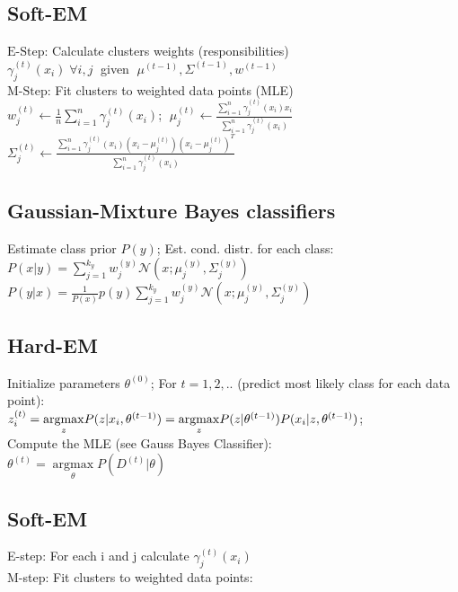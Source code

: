 \subsection*{Soft-EM}
$\text{E-Step}$: Calculate clusters weights (responsibilities)\\
$\gamma_j^{(t)}(x_i) \; \forall i,j \; $ given $ \; \mu^{(t-1)},\Sigma^{(t-1)}, w^{(t-1)}$ \\
$\text{M-Step}$: Fit clusters to weighted data points (MLE)\\
$w_j^{(t)} \leftarrow \frac{1}{n} \sum_{i=1}^n \gamma_j^{(t)} (x_i)$;  
$\; \mu_j^{(t)} \leftarrow \frac{\sum_{i=1}^n \gamma_j^{(t)} (x_i) x_i}{\sum_{i=1}^n \gamma_j^{(t)} (x_i)}$\\ 
$\Sigma_j^{(t)} \leftarrow \frac{\sum_{i=1}^n \gamma_j^{(t)}(x_i) (x_i - \mu_j^{(t)}) (x_i - \mu_j^{(t)})^T}{\sum_{i=1}^n \gamma_j^{(t)}(x_i)}$\\ 




\iffalse
\subsection*{Gaussian-Mixture Bayes classifiers}
Estimate class prior $P(y)$; Est. cond. distr. for each class:
$P(x|y) = \sum_{j=1}^{k_y} w_j^{(y)} \mathcal{N}(x; \mu_j^{(y)}, \Sigma_j^{(y)})$\\
$P(y|x) = \frac{1}{P(x)} p(y) \sum_{j=1}^{k_y} w_j^{(y)} \mathcal{N}(x; \mu_j^{(y)}, \Sigma_j^{(y)})$

\subsection*{Hard-EM}
Initialize parameters $\theta^{(0)}$; For $t=1,2,..$ (predict most likely class for each data point):\\
$z_i^{(t)} = \underset{z}{\operatorname{argmax}} P(z|x_i, \theta^{(t-1)})\\
= \underset{z}{\operatorname{argmax}} P(z|\theta^{(t-1)}) P(x_i|z,\theta^{(t-1)})$;\\
Compute the MLE (see Gauss Bayes Classifier):\\
$\theta^{(t)} = \underset{\theta}{\operatorname{argmax}} P(D^{(t)}|\theta)$

\subsection*{Soft-EM}
E-step: For each i and j calculate $\gamma_j^{(t)}(x_i)$\\
M-step: Fit clusters to weighted data points:\\

